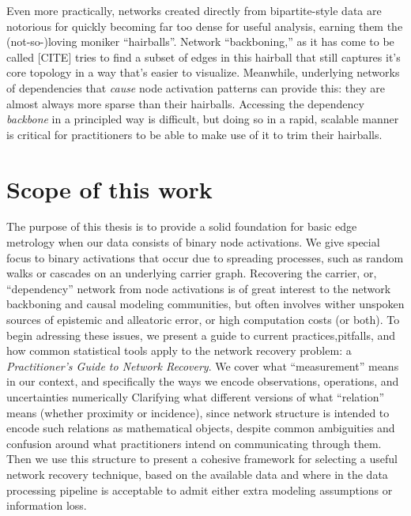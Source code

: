 \documentclass[%
	12pt,
		oneside,
		letterpaper
]{book}
\begin{document}
Even more practically, networks created directly from bipartite-style
data are notorious for quickly becoming far too dense for useful
analysis, earning them the (not-so-)loving moniker ``hairballs''.
Network ``backboning,'' as it has come to be called {[}CITE{]} tries to
find a subset of edges in this hairball that still captures it's core
topology in a way that's easier to visualize. Meanwhile, underlying
networks of dependencies that \emph{cause} node activation patterns can
provide this: they are almost always more sparse than their hairballs.
Accessing the dependency \emph{backbone} in a principled way is
difficult, but doing so in a rapid, scalable manner is critical for
practitioners to be able to make use of it to trim their hairballs.

\section{Scope of this work}\label{scope-of-this-work}

The purpose of this thesis is to provide a solid foundation for basic
edge metrology when our data consists of binary node activations. We
give special focus to binary activations that occur due to spreading
processes, such as random walks or cascades on an underlying carrier
graph. Recovering the carrier, or, ``dependency'' network from node
activations is of great interest to the network backboning and causal
modeling communities, but often involves wither unspoken sources of
epistemic and alleatoric error, or high computation costs (or both). To
begin adressing these issues, we present a guide to current
practices,pitfalls, and how common statistical tools apply to the
network recovery problem: a \emph{Practitioner's Guide to Network
Recovery}. We cover what ``measurement'' means in our context, and
specifically the ways we encode observations, operations, and
uncertainties numerically Clarifying what different versions of what
``relation'' means (whether proximity or incidence), since network
structure is intended to encode such relations as mathematical objects,
despite common ambiguities and confusion around what practitioners
intend on communicating through them. Then we use this structure to
present a cohesive framework for selecting a useful network recovery
technique, based on the available data and where in the data processing
pipeline is acceptable to admit either extra modeling assumptions or
information loss.
\end{document}
